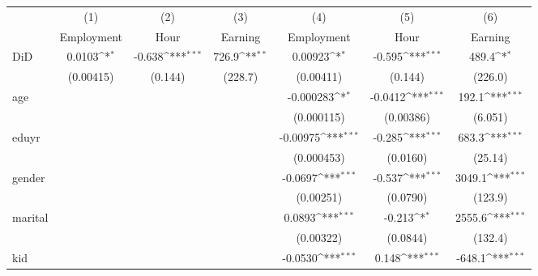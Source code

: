 {
\def\sym#1{\ifmmode^{#1}\else\(^{#1}\)\fi}
\begin{tabular}{l*{6}{c}}
\hline\hline
            &\multicolumn{1}{c}{(1)}&\multicolumn{1}{c}{(2)}&\multicolumn{1}{c}{(3)}&\multicolumn{1}{c}{(4)}&\multicolumn{1}{c}{(5)}&\multicolumn{1}{c}{(6)}\\
            &\multicolumn{1}{c}{Employment}&\multicolumn{1}{c}{Hour}&\multicolumn{1}{c}{Earning}&\multicolumn{1}{c}{Employment}&\multicolumn{1}{c}{Hour}&\multicolumn{1}{c}{Earning}\\
\hline
DiD         &      0.0103\sym{*}  &      -0.638\sym{***}&       726.9\sym{**} &     0.00923\sym{*}  &      -0.595\sym{***}&       489.4\sym{*}  \\
            &   (0.00415)         &     (0.144)         &     (228.7)         &   (0.00411)         &     (0.144)         &     (226.0)         \\
[1em]
age         &                     &                     &                     &   -0.000283\sym{*}  &     -0.0412\sym{***}&       192.1\sym{***}\\
            &                     &                     &                     &  (0.000115)         &   (0.00386)         &     (6.051)         \\
[1em]
eduyr       &                     &                     &                     &    -0.00975\sym{***}&      -0.285\sym{***}&       683.3\sym{***}\\
            &                     &                     &                     &  (0.000453)         &    (0.0160)         &     (25.14)         \\
[1em]
gender      &                     &                     &                     &     -0.0697\sym{***}&      -0.537\sym{***}&      3049.1\sym{***}\\
            &                     &                     &                     &   (0.00251)         &    (0.0790)         &     (123.9)         \\
[1em]
marital     &                     &                     &                     &      0.0893\sym{***}&      -0.213\sym{*}  &      2555.6\sym{***}\\
            &                     &                     &                     &   (0.00322)         &    (0.0844)         &     (132.4)         \\
[1em]
kid         &                     &                     &                     &     -0.0530\sym{***}&       0.148\sym{***}&      -648.1\sym{***}\\

\end{tabular}}
